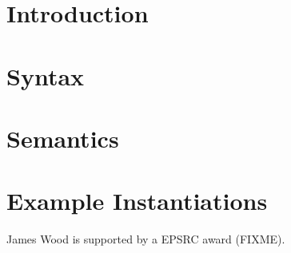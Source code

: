 \documentclass[sigplan,review]{acmart}\settopmatter{printfolios=true,printccs=false,printacmref=false}
\begin{document}
\section{Introduction}
\label{sec:introduction}


\section{Syntax}
\label{sec:syntax}


\section{Semantics}
\label{sec:semantics}


\section{Example Instantiations}
\label{sec:examples}



\begin{acks}                            %
  James Wood is supported by a EPSRC award (FIXME).
\end{acks}


%



\end{document}
